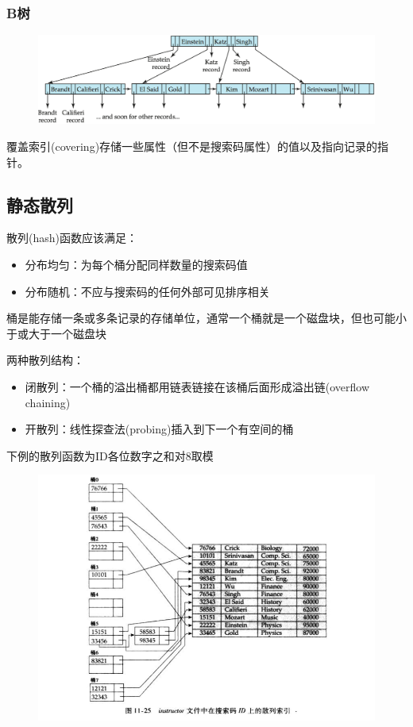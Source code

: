 \subsubsection{B树}
\begin{figure}[H]
\centering
\includegraphics[width=0.8\linewidth]{fig/b-tree.png}
\end{figure}

覆盖索引(covering)存储一些属性（但不是搜索码属性）的值以及指向记录的指针。

\subsection{静态散列}
散列(hash)函数应该满足：
\begin{itemize}
	\item 分布均匀：为每个桶分配同样数量的搜索码值
	\item 分布随机：不应与搜索码的任何外部可见排序相关
\end{itemize}
\begin{definition}[桶(bucket)]
桶是能存储一条或多条记录的存储单位，通常一个桶就是一个磁盘块，但也可能小于或大于一个磁盘块
\end{definition}

两种散列结构：
\begin{itemize}
	\item 闭散列：一个桶的溢出桶都用链表链接在该桶后面形成溢出链(overflow chaining)
	\item 开散列：线性探查法(probing)插入到下一个有空间的桶
\end{itemize}

下例的散列函数为ID各位数字之和对8取模
\begin{figure}[H]
\centering
\includegraphics[width=0.8\linewidth]{fig/hash_index.png}
\end{figure}

